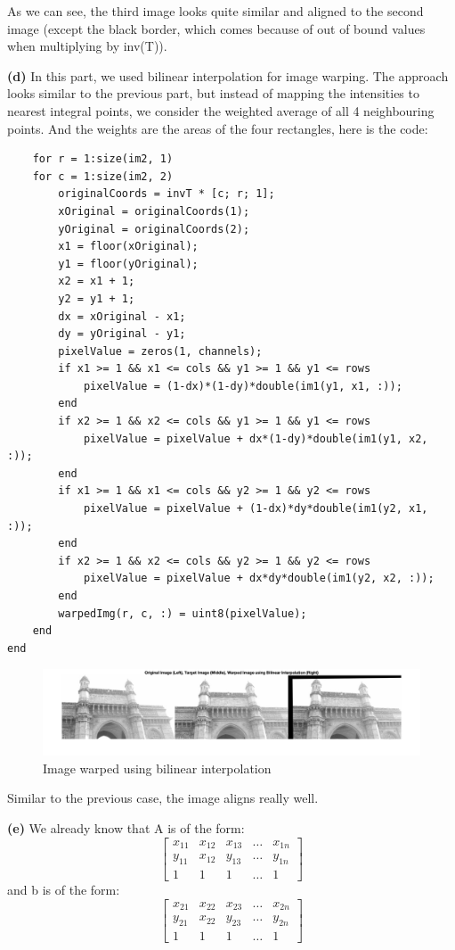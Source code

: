 \documentclass[12pt]{article}
\begin{document}
As we can see, the third image looks quite similar and aligned to the second image (except the black border, which comes because of out of bound values when multiplying by inv(T)).


\textbf{(d)}
In this part, we used bilinear interpolation for image warping. The approach looks similar to the previous part, but instead of mapping the intensities to nearest integral points, we consider the weighted average of all 4 neighbouring points. And the weights are the areas of the four rectangles, here is the code:
\begin{verbatim}
    for r = 1:size(im2, 1)
    for c = 1:size(im2, 2)
        originalCoords = invT * [c; r; 1];
        xOriginal = originalCoords(1);
        yOriginal = originalCoords(2);
        x1 = floor(xOriginal);
        y1 = floor(yOriginal);
        x2 = x1 + 1;
        y2 = y1 + 1;
        dx = xOriginal - x1;
        dy = yOriginal - y1;
        pixelValue = zeros(1, channels);
        if x1 >= 1 && x1 <= cols && y1 >= 1 && y1 <= rows
            pixelValue = (1-dx)*(1-dy)*double(im1(y1, x1, :));
        end
        if x2 >= 1 && x2 <= cols && y1 >= 1 && y1 <= rows
            pixelValue = pixelValue + dx*(1-dy)*double(im1(y1, x2, :));
        end
        if x1 >= 1 && x1 <= cols && y2 >= 1 && y2 <= rows
            pixelValue = pixelValue + (1-dx)*dy*double(im1(y2, x1, :));
        end
        if x2 >= 1 && x2 <= cols && y2 >= 1 && y2 <= rows
            pixelValue = pixelValue + dx*dy*double(im1(y2, x2, :));
        end
        warpedImg(r, c, :) = uint8(pixelValue);
    end
end   
\end{verbatim} 
\begin{figure}[h]
    \centering
    \includegraphics[width=\linewidth]{Images/Q6/bilinear.jpg}
    \caption{Image warped using bilinear interpolation}
\end{figure}
Similar to the previous case, the image aligns really well.

\textbf{(e)}
We already know that A is of the form:
\[
    \begin{bmatrix}
        x_{11} & x_{12} & x_{13} & \dots & x_{1n} \\
        y_{11} & x_{12} & y_{13} & \dots & y_{1n} \\
        1 & 1 & 1 & \dots & 1
    \end{bmatrix}
\]
and b is of the form:
\[
    \begin{bmatrix}
        x_{21} & x_{22} & x_{23} & \dots & x_{2n} \\
        y_{21} & x_{22} & y_{23} & \dots & y_{2n} \\
        1 & 1 & 1 & \dots & 1
    \end{bmatrix}
\]
\end{document}
